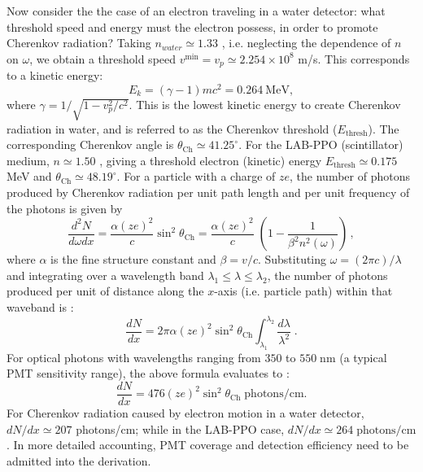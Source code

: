 Now consider the the case of an electron traveling in a water detector: what threshold speed and energy must the electron possess, in order to promote Cherenkov radiation? Taking $n_{water}\simeq 1.33$ \cite{pdg2020}, i.e. neglecting the dependence of $n$ on $\omega$, we obtain a threshold speed $v^{\mathrm{min}} = v_p \simeq 2.254\times10^8$ m/s. This corresponds to a kinetic energy:
\begin{equation*}
E_k=(\gamma-1)mc^2=0.264~\mathrm{MeV},
\end{equation*}
where $\gamma=1/\sqrt{1-v_p^2/c^2}$. This is the lowest kinetic energy to create Cherenkov radiation in water, and is referred to as the Cherenkov threshold ($E_{\mathrm{thresh}}$). The corresponding Cherenkov angle is $\theta_\mathrm{Ch}\simeq 41.25^\circ$. For the LAB-PPO (scintillator) medium, $n\simeq 1.50$ \cite{tseung2011ellipsometric}, giving a threshold electron (kinetic) energy $E_{\mathrm{thresh}}\simeq 0.175$ MeV and $\theta_\mathrm{Ch}\simeq 48.19^\circ$.
For a particle with a charge of $ze$, the number of photons produced by Cherenkov radiation per unit path length and per unit frequency of the photons is given by \cite{leo2012techniques}
\begin{equation}
\frac{d^2N}{d\omega dx}=\frac{\alpha (ze)^2}{c}\sin^2\theta_\mathrm{Ch}=\frac{\alpha (ze)^2}{c} \; \left(1-\frac{1}{\beta^2 n^2(\omega)} \right) \, ,
\end{equation}
where $\alpha$ is the fine structure constant and $\beta=v/c$. Substituting $\omega= (2\pi c)/\lambda$ and integrating over a wavelength band $\lambda_1 \le \lambda \le \lambda_2$, the number of photons produced per unit of distance along the $x$-axis (i.e. particle path) within that waveband is \cite{leo2012techniques}:
\begin{equation}
\frac{dN}{dx}=2\pi \alpha (ze)^2\sin^2\theta_\mathrm{Ch}\int_{\lambda_1}^{\lambda_2}\frac{d\lambda}{\lambda^2} \; .
\end{equation}
For optical photons with wavelengths ranging from $350$ to $550 \; \mathrm{nm}$ (a typical PMT sensitivity range), the above formula evaluates to \cite{leo2012techniques}:
\begin{equation}
\frac{dN}{dx}=476(ze)^2\sin^2\theta_\mathrm{Ch} \; \mathrm{photons/cm}.
\end{equation}
For Cherenkov radiation caused by electron motion in a water detector, $dN/dx \simeq 207$ photons/cm; while in the LAB-PPO case, $dN/dx \simeq 264 \; \mathrm{photons/cm}$. In more detailed accounting, PMT coverage and detection efficiency need to be admitted into the derivation.

